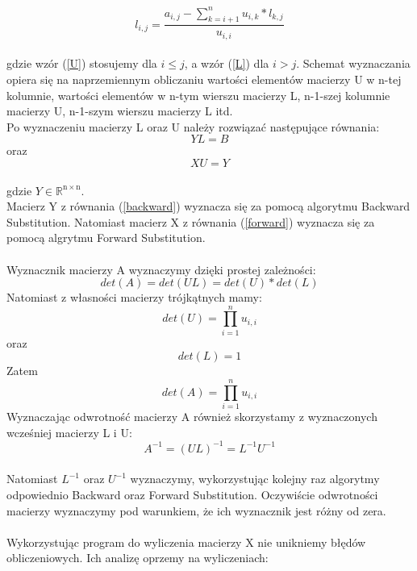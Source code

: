 \documentclass[12pt]{article}
\begin{document}
\begin{equation}
l_{i,j}=\dfrac{a_{i,j}-\sum_{k=i+1}^n u_{i,k}*l_{k,j}}{u_{i,i}} \label{L}
\end{equation}
\\
gdzie wz\'or (\ref{U}) stosujemy dla $i \leq j$, a wz\'or (\ref{L}) dla $i > j$.
Schemat wyznaczania opiera si\k{e} na naprzemiennym obliczaniu warto\'sci element\'ow macierzy U w n-tej kolumnie, warto\'sci element\'ow w n-tym wierszu macierzy L, n-1-szej kolumnie macierzy U, n-1-szym wierszu macierzy L itd.
\\
Po wyznaczeniu macierzy L oraz U nale\.zy rozwi\k{a}za\'c nast\k{e}puj\k{a}ce r\'ownania:
\begin{equation}
YL=B \label{backward}
\end{equation}
oraz
\begin{equation}
XU=Y \label{forward}
\end{equation}
\\
gdzie $Y\in \mathbb R^\mathrm{n\times n}$. 
\\
Macierz Y z r\'ownania (\ref{backward}) wyznacza si\k{e} za pomoc\k{a} algorytmu Backward Substitution. Natomiast macierz X z r\'ownania (\ref{forward}) wyznacza si\k{e} za pomoc\k{a} algrytmu Forward Substitution.
\\
\\
Wyznacznik macierzy A wyznaczymy dzi\k{e}ki prostej zale\.zno\'sci:
\[
det(A)=det(UL)=det(U)*det(L)
\]
Natomiast z w\l{}asno\'sci macierzy tr\'ojk\k{a}tnych mamy:
\[
det(U)=\prod_{i=1}^n u_{i,i}
\]
oraz
\[
det(L)=1
\]
Zatem 
\[
det(A)=\prod_{i=1}^n u_{i,i}
\]
Wyznaczaj\k{a}c odwrotno\'s\'c macierzy A r\'ownie\.z skorzystamy z wyznaczonych wcze\'sniej macierzy L i U:
\[
A^{-1}=(UL)^{-1}=L^{-1}U^{-1}
\]
\\
Natomiast $L^{-1}$ oraz $U^{-1}$ wyznaczymy, wykorzystuj\k{a}c kolejny raz algorytmy odpowiednio Backward oraz Forward Substitution. Oczywi\'scie odwrotno\'sci macierzy wyznaczymy pod warunkiem, \.ze ich wyznacznik jest r\'o\.zny od zera. 
\\
\\
Wykorzystuj\k{a}c program do wyliczenia macierzy X nie unikniemy b\l{}\k{e}d\'ow obliczeniowych. Ich analiz\k{e} oprzemy na wyliczeniach:
\end{document}
